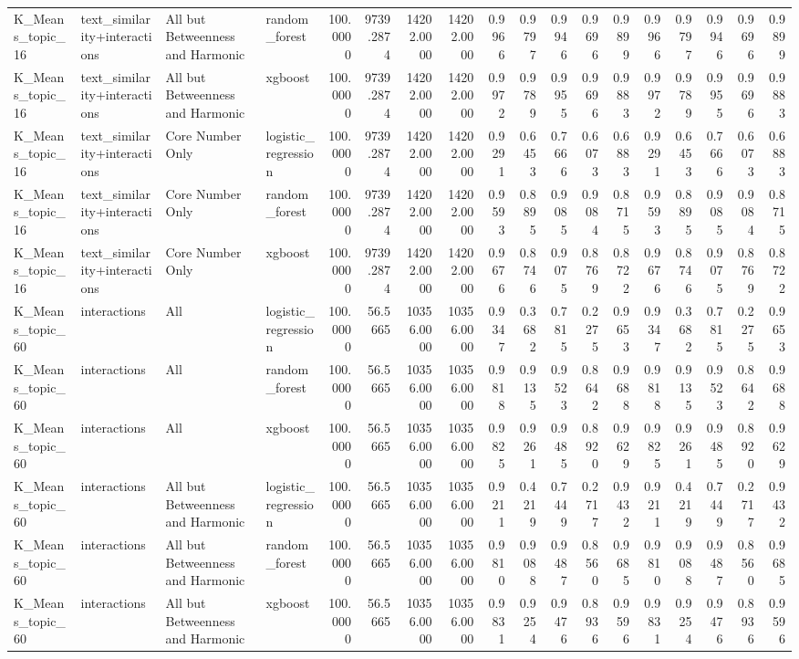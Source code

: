 \begin{tabular}{llllrrrrrrrrrrrrrr}
K_Means_topic_16 & text_similarity+interactions & All but Betweenness and Harmonic & random_forest & 100.0000 & 9739.2874 & 14202.0000 & 14202.0000 & 0.9966 & 0.9797 & 0.9946 & 0.9696 & 0.9899 & 0.9966 & 0.9797 & 0.9946 & 0.9696 & 0.9899 \\
K_Means_topic_16 & text_similarity+interactions & All but Betweenness and Harmonic & xgboost & 100.0000 & 9739.2874 & 14202.0000 & 14202.0000 & 0.9972 & 0.9789 & 0.9955 & 0.9696 & 0.9883 & 0.9972 & 0.9789 & 0.9955 & 0.9696 & 0.9883 \\
K_Means_topic_16 & text_similarity+interactions & Core Number Only & logistic_regression & 100.0000 & 9739.2874 & 14202.0000 & 14202.0000 & 0.9291 & 0.6453 & 0.7666 & 0.6073 & 0.6883 & 0.9291 & 0.6453 & 0.7666 & 0.6073 & 0.6883 \\
K_Means_topic_16 & text_similarity+interactions & Core Number Only & random_forest & 100.0000 & 9739.2874 & 14202.0000 & 14202.0000 & 0.9593 & 0.8895 & 0.9085 & 0.9084 & 0.8715 & 0.9593 & 0.8895 & 0.9085 & 0.9084 & 0.8715 \\
K_Means_topic_16 & text_similarity+interactions & Core Number Only & xgboost & 100.0000 & 9739.2874 & 14202.0000 & 14202.0000 & 0.9676 & 0.8746 & 0.9075 & 0.8769 & 0.8722 & 0.9676 & 0.8746 & 0.9075 & 0.8769 & 0.8722 \\
K_Means_topic_60 & interactions & All & logistic_regression & 100.0000 & 56.5665 & 10356.0000 & 10356.0000 & 0.9347 & 0.3682 & 0.7815 & 0.2275 & 0.9653 & 0.9347 & 0.3682 & 0.7815 & 0.2275 & 0.9653 \\
K_Means_topic_60 & interactions & All & random_forest & 100.0000 & 56.5665 & 10356.0000 & 10356.0000 & 0.9818 & 0.9135 & 0.9523 & 0.8642 & 0.9688 & 0.9818 & 0.9135 & 0.9523 & 0.8642 & 0.9688 \\
K_Means_topic_60 & interactions & All & xgboost & 100.0000 & 56.5665 & 10356.0000 & 10356.0000 & 0.9825 & 0.9261 & 0.9485 & 0.8920 & 0.9629 & 0.9825 & 0.9261 & 0.9485 & 0.8920 & 0.9629 \\
K_Means_topic_60 & interactions & All but Betweenness and Harmonic & logistic_regression & 100.0000 & 56.5665 & 10356.0000 & 10356.0000 & 0.9211 & 0.4219 & 0.7449 & 0.2717 & 0.9432 & 0.9211 & 0.4219 & 0.7449 & 0.2717 & 0.9432 \\
K_Means_topic_60 & interactions & All but Betweenness and Harmonic & random_forest & 100.0000 & 56.5665 & 10356.0000 & 10356.0000 & 0.9810 & 0.9088 & 0.9487 & 0.8560 & 0.9685 & 0.9810 & 0.9088 & 0.9487 & 0.8560 & 0.9685 \\
K_Means_topic_60 & interactions & All but Betweenness and Harmonic & xgboost & 100.0000 & 56.5665 & 10356.0000 & 10356.0000 & 0.9831 & 0.9254 & 0.9476 & 0.8936 & 0.9596 & 0.9831 & 0.9254 & 0.9476 & 0.8936 & 0.9596 \\

\end{tabular}
